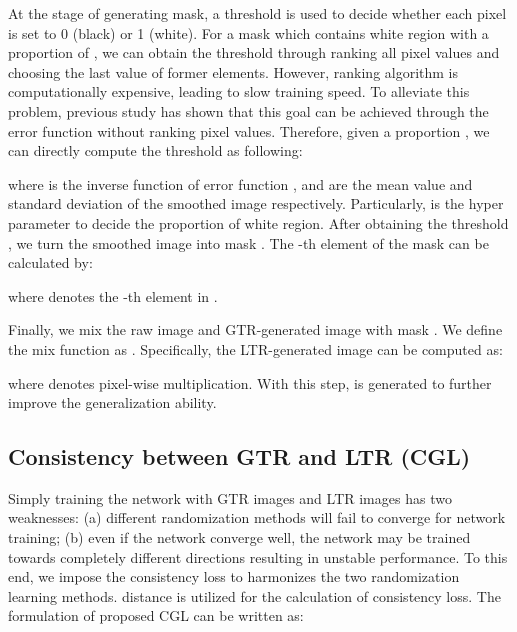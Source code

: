 \documentclass[twocolumn,journal,vlined,ruled,linesnumbered]{IEEEtran}
\begin{document}
At the stage of generating mask, a threshold  is used to decide whether each pixel is set to 0 (black) or 1 (white). For a mask which contains white region with a proportion of , we can obtain the threshold  through ranking all pixel values and choosing the last value of former  elements. However, ranking algorithm is computationally expensive, leading to slow training speed. To alleviate this problem, previous study \cite{french2019semi} has shown that this goal can be achieved through the error function \cite{andrews1998special} without ranking pixel values. Therefore, given a proportion , we can directly compute the threshold  as following:

\vspace{-2mm}


where  is the inverse function of error function  \cite{andrews1998special},  and  are the mean value and standard deviation of the smoothed image  respectively. Particularly,  is the hyper parameter to decide the proportion of white region. After obtaining the threshold , we turn the smoothed image  into mask . The -th element  of the mask  can be calculated by:

\vspace{-2mm}


where  denotes the -th element in .

Finally, we mix the raw image  and GTR-generated image  with mask . We define the mix function as . Specifically, the LTR-generated image  can be computed as:

\vspace{-2mm}


where  denotes pixel-wise multiplication. With this step,  is generated to further improve the generalization ability.

\subsection{Consistency between GTR and LTR (CGL)\label{subsec:Consistency-between-TR}}

Simply training the network with GTR images and LTR images has two weaknesses: (a) different randomization methods will fail to converge for network training; (b) even if the network converge well, the network may be trained towards completely different directions resulting in unstable performance. To this end, we impose the consistency loss to harmonizes the two randomization learning methods.  distance is utilized for the calculation of consistency loss. The formulation of proposed CGL can be written as:
\end{document}
